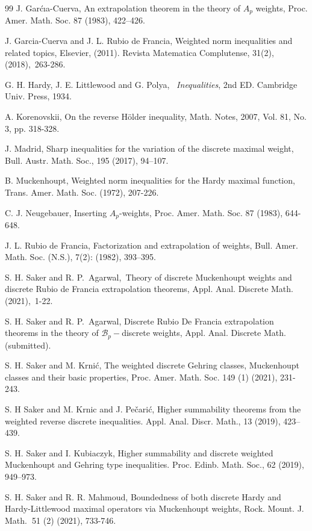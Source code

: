 \documentclass[a4paper]{amsart}
\theoremstyle{plain}
\numberwithin{equation}{section}
\begin{document}
\begin{thebibliography}{99}
 J. Gar\'{c}\i a-Cuerva, An extrapolation theorem in the theory
of $A_{p}$ weights, Proc. Amer. Math. Soc. 87 (1983), 422--426.

 J. Garcia-Cuerva and J. L. Rubio de Francia, Weighted norm
inequalities and related topics, Elsevier, (2011). Revista Matematica
Complutense, 31(2), (2018),\ 263-286.

 G. H. Hardy, J. E. Littlewood and G. Polya, \textit{\
Inequalities}, 2nd ED. Cambridge Univ. Press, 1934.

 A. Korenovskii, On the reverse H\"{o}lder inequality,
Math. Notes, 2007, Vol. 81, No. 3, pp. 318-328.

 J. Madrid, Sharp inequalities for the variation of the discrete
maximal weight, Bull. Austr. Math. Soc., 195 (2017), 94--107.

 B. Muckenhoupt, Weighted norm inequalities for the Hardy maximal
function, Trans. Amer. Math. Soc. (1972), 207-226.

 C. J. Neugebauer, Inserting $A_{p}$-weights, Proc. Amer. Math.
Soc. 87 (1983), 644-648.

 J. L. Rubio de Francia, Factorization and extrapolation of
weights, Bull. Amer. Math. Soc. (N.S.), 7(2): (1982), 393--395.

 S. H. Saker and R. P.\ Agarwal,\ Theory of discrete
Muckenhoupt weights and discrete Rubio de Francia extrapolation theorems,
Appl. Anal. Discrete Math. (2021),\ 1-22.

 S. H. Saker and R. P.\ Agarwal, Discrete Rubio De Francia
extrapolation theorems in the theory of $\mathcal{B}_{p}-$discrete weights,
Appl. Anal. Discrete Math. (submitted).

 S. H. Saker and M. Krni\'{c}, The weighted discrete Gehring
classes, Muckenhoupt classes and their basic properties, Proc. Amer. Math.
Soc. 149 (1) (2021), 231-243.

 S. H Saker and M. Krnic and J. Pe\v{c}ari\'{c}, Higher
summability theorems from the weighted reverse discrete inequalities. Appl.
Anal. Discr. Math., 13 (2019), 423--439.

 S. H. Saker and I. Kubiaczyk, Higher summability and discrete
weighted Muckenhoupt and Gehring type inequalities. Proc. Edinb. Math. Soc.,
62 (2019), 949--973.

 S. H. Saker and R. R. Mahmoud, Boundedness of both
discrete Hardy and Hardy-Littlewood maximal operators via Muckenhoupt
weights, Rock. Mount. J. Math.\textbf{\ }51 (2) (2021), 733-746.


\end{thebibliography}
\end{document}
